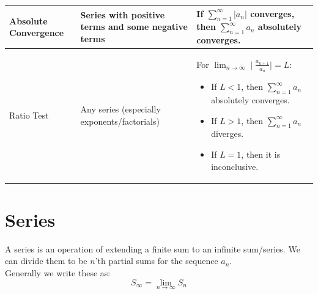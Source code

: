 \documentclass{article}
\begin{document}
\begin{center}
{\begin{tabular}{| p{2cm} | p{6.75cm} | p{6.75cm} | }
        \hline
        Absolute Convergence & Series with positive terms and some negative terms & If $\sum_{n=1}^\infty |a_n|$ converges, then $\sum_{n=1}^\infty a_n$ absolutely converges.\\
        \hline
        Ratio Test & Any series (especially exponents/factorials) & For $\lim_{n\to\infty} \mid \frac{a_{n+1}}{a_n}\mid = L$:
        \setlist{nolistsep}\begin{itemize}[noitemsep]
            \item If $L<1$, then $\sum_{n=1}^\infty a_n$ absolutely converges.
            \item If $L > 1$, then $\sum_{n=1}^\infty a_n$ diverges.
            \item If $L = 1$, then it is inconclusive.
        \end{itemize}\\
        \hline
    \end{tabular}
    }
\end{center}
\newpage
\section{Series}
A series is an operation of extending a finite sum to an infinite sum/series. We can divide them to be $n$'th partial sums for the sequence $a_n$.\\
Generally we write these as:
$$S_\infty = \lim_{n\to\infty} S_n$$
\end{document}
